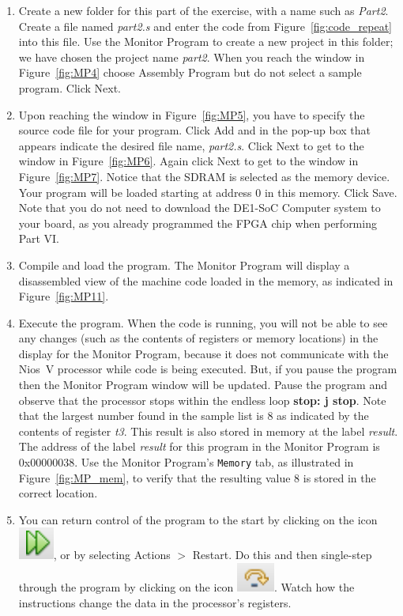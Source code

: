 \documentclass[epsfig,10pt,fullpage]{article}
\begin{document}
\begin{enumerate}
\item Create a new folder for this part of the exercise, with a name such as {\it Part2}.  
Create a file named {\it part2.s} and enter the code from Figure~\ref{fig:code_repeat} into this
file.  Use the Monitor Program to create a new project in this folder; we have chosen the 
project name {\it part2}.  When you reach the window in Figure~\ref{fig:MP4} 
choose {\sf Assembly Program} but do not select a sample program. Click {\sf Next}.
\item Upon reaching the window in Figure~\ref{fig:MP5}, you have to specify the source
code file for your program. Click {\sf Add} and in the pop-up box that appears 
indicate the desired file name,
{\it part2.s}.  Click {\sf Next} to get to the window in Figure~\ref{fig:MP6}. 
Again click {\sf Next} to get to the window in Figure~\ref{fig:MP7}. Notice that the 
SDRAM is selected as the memory device.  Your program will be loaded starting at
address 0 in this memory.  Click {\sf Save}. Note that you do not need to download 
the DE1-SoC Computer system to your board, as you already programmed the FPGA chip when
performing Part VI.

\item Compile and load the program. The
Monitor Program will display a disassembled view of the machine code loaded
in the memory, as indicated in Figure~\ref{fig:MP11}. 

\item Execute the program.
When the code is running, you will not be able to see any changes
(such as the contents of registers or memory locations) in the display for the Monitor Program,
because it does not communicate with the Nios~V processor while code is being
executed.  But, if you pause the program then the Monitor Program window will be updated.
Pause the program 
and observe that the processor stops within the endless loop {\bf stop: j stop}.
Note that the largest number found in the sample list is 8 as indicated
by the contents of register {\it t3}. This result is also stored in memory at the label
{\it result}.  The address of the label {\it result} for this program in the Monitor
Program is {\sf 0x00000038}.
Use the Monitor Program's \texttt{Memory} tab, as illustrated in Figure~\ref{fig:MP_mem},
to verify that the resulting value 8 is stored in the correct location.

\item You can return control of the program to the start by clicking on the icon 
\hbox{\includegraphics[scale=0.4]{figures/Restart.png}}, or by selecting 
{\sf Actions} $>$ {\sf Restart}. 
Do this and then single-step through the program by clicking on the icon
\hbox{\includegraphics[scale=0.4]{figures/Step.png}}. Watch how the instructions change the 
data in the processor's registers.


\end{enumerate}
\end{document}
